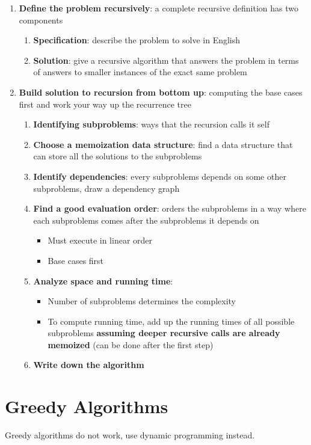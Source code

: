   \begin{enumerate}
    \item \textbf{Define the problem recursively}: a complete recursive
    definition has two components
    \begin{enumerate}
      \item \textbf{Specification}: describe the problem to solve in English
      \item \textbf{Solution}: give a recursive algorithm that answers
      the problem in terms of answers to smaller instances of the exact same
      problem
    \end{enumerate}

    \item \textbf{Build solution to recursion from bottom up}: computing the
    base cases first and work your way up the recurrence tree
    \begin{enumerate}
      \item \textbf{Identifying subproblems}: ways that the recursion calls it
      self
      \item \textbf{Choose a memoization data structure}: find a data structure
      that can store all the solutions to the subproblems
      \item \textbf{Identify dependencies}: every subproblems depends on
      some other subproblems, draw a dependency graph
      \item \textbf{Find a good evaluation order}: orders the subproblems in a
      way where each subproblems comes after the subproblems it depends on
      \begin{itemize}
        \item Must execute in linear order
        \item Base cases first
      \end{itemize}

      \item \textbf{Analyze space and running time}:
      \begin{itemize}
        \item Number of subproblems determines the complexity
        \item To compute running time, add up the running times of all possible
        subproblems \textbf{assuming deeper recursive calls are already
        memoized} (can be done after the first step)
      \end{itemize}

      \item \textbf{Write down the algorithm}
    \end{enumerate}
  \end{enumerate}

\section{Greedy Algorithms}

  Greedy algorithms do not work, use dynamic programming instead.
